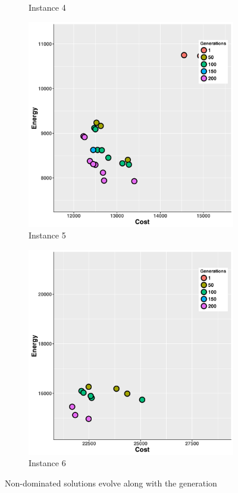 \begin{figure}
\begin{subfigure}[b]{0.45\textwidth}
   \caption{Instance 4}
   \label{fig:d}
   \end{subfigure}
   \begin{subfigure}[b]{0.45\textwidth}\includegraphics[width=\textwidth]{pics/preliminary/without/testCase5_.png}
   \caption{Instance 5}
   \label{fig:e}
   \end{subfigure}
   \begin{subfigure}[b]{0.45\textwidth}\includegraphics[width=\textwidth]{pics/preliminary/without/testCase6_.png}
   \caption{Instance 6}
   \label{fig:f}
   \end{subfigure}
   \caption{Non-dominated solutions evolve along with the generation}
   \label{fig:evolve}
\end{figure}

